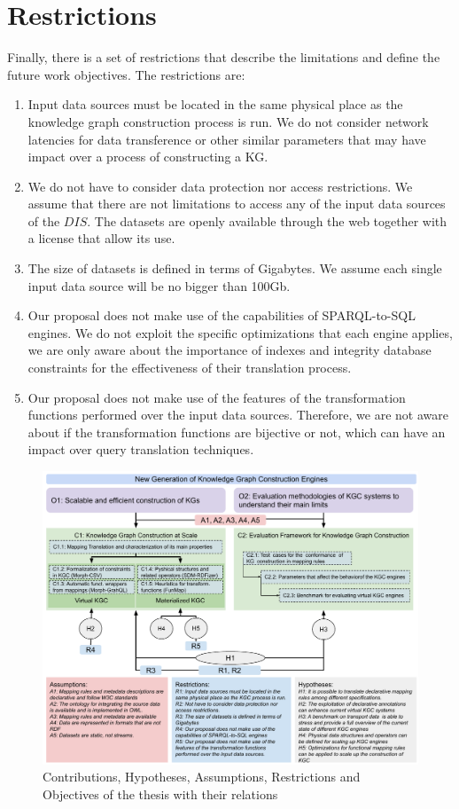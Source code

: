 \section{Restrictions}
Finally, there is a set of restrictions that describe the limitations and define the future work objectives. The restrictions are:

\begin{enumerate}[label=\textbf{R{\arabic*}}]
    \item Input data sources must be located in the same physical place as the knowledge graph construction process is run. We do not consider network latencies for data transference or other similar parameters that may have impact over a process of constructing a KG. 
     \item We do not have to consider data protection nor access restrictions. We assume that there are not limitations to access any of the input data sources of the $DIS$. The datasets are openly available through the web together with a license that allow its use.
    \item The size of datasets is defined in terms of Gigabytes. We assume each single input data source will be no bigger than 100Gb.
    \item Our proposal does not make use of the capabilities of SPARQL-to-SQL engines. We do not exploit the specific optimizations that each engine applies, we are only aware about the importance of indexes and integrity database constraints for the effectiveness of their translation process.
    \item Our proposal does not make use of the features of the transformation functions performed over the input data sources. Therefore, we are not aware about if the transformation functions are bijective or not, which can have an impact over query translation techniques.  
\end{enumerate}



\begin{figure}[!t]
\centering
\includegraphics[angle=90,width=1\textwidth]{figures/summarize contributions.pdf}
\caption[Relations of the contributions of the thesis]{Contributions, Hypotheses, Assumptions, Restrictions and Objectives of the thesis with their relations}
\label{fig:objectives_contributions}
\end{figure}